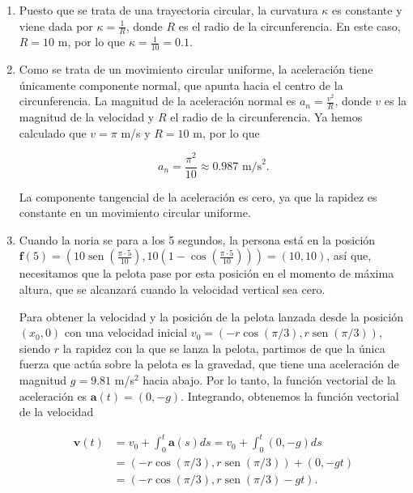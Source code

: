 \documentclass[
  spanish,
  a4paper,
]{scrreport}
\theoremstyle{definition}
\theoremstyle{remark}
\begin{document}
\begin{tcolorbox}
\begin{enumerate}
  Podríamos haber llegado a este mismo resultado observando que en
  \(2.5\) segundos la noria completa un cuarto de vuelta (ya que tarda
  \(20\) segundos en una vuelta completa), y la longitud de un cuarto de
  circunferencia de radio \(10\) m es
  \(\frac{1}{4} \cdot 2\pi \cdot 10 = 5\pi\) m, que coincide con el
  resultado anterior.
\item
  Puesto que se trata de una trayectoria circular, la curvatura
  \(\kappa\) es constante y viene dada por \(\kappa = \frac{1}{R}\),
  donde \(R\) es el radio de la circunferencia. En este caso, \(R = 10\)
  m, por lo que \(\kappa = \frac{1}{10} = 0.1\).
\item
  Como se trata de un movimiento circular uniforme, la aceleración tiene
  únicamente componente normal, que apunta hacia el centro de la
  circunferencia. La magnitud de la aceleración normal es
  \(a_n = \frac{v^2}{R}\), donde \(v\) es la magnitud de la velocidad y
  \(R\) el radio de la circunferencia. Ya hemos calculado que
  \(v = \pi\) m/s y \(R = 10\) m, por lo que

  \[
  a_n = \frac{\pi^2}{10} \approx 0.987 \text{ m/s}^2.
  \]

  La componente tangencial de la aceleración es cero, ya que la rapidez
  es constante en un movimiento circular uniforme.
\item
  Cuando la noria se para a los 5 segundos, la persona está en la
  posición
  \(\mathbf{f}(5) = (10\operatorname{sen}(\frac{\pi \cdot 5}{10}), 10(1-\cos(\frac{\pi \cdot 5}{10}))) = (10, 10)\),
  así que, necesitamos que la pelota pase por esta posición en el
  momento de máxima altura, que se alcanzará cuando la velocidad
  vertical sea cero.

  Para obtener la velocidad y la posición de la pelota lanzada desde la
  posición \((x_0,0)\) con una velocidad inicial
  \(v_0=(-r\cos(\pi/3), r\operatorname{sen}(\pi/3))\), siendo \(r\) la
  rapidez con la que se lanza la pelota, partimos de que la única fuerza
  que actúa sobre la pelota es la gravedad, que tiene una aceleración de
  magnitud \(g = 9.81\) m/s\(^2\) hacia abajo. Por lo tanto, la función
  vectorial de la aceleración es \(\mathbf{a}(t) = (0, -g)\).
  Integrando, obtenemos la función vectorial de la velocidad

  \begin{align*}
  \mathbf{v}(t) &= v_0 + \int_0^t \mathbf{a}(s) ds 
  = v_0 + \int_0^t (0, -g) ds \\
  &= (-r\cos(\pi/3), r\operatorname{sen}(\pi/3)) + (0, -gt) \\
  &= (-r\cos(\pi/3), r\operatorname{sen}(\pi/3) - gt).
  \end{align*}


\end{enumerate}
\end{tcolorbox}
\end{document}

